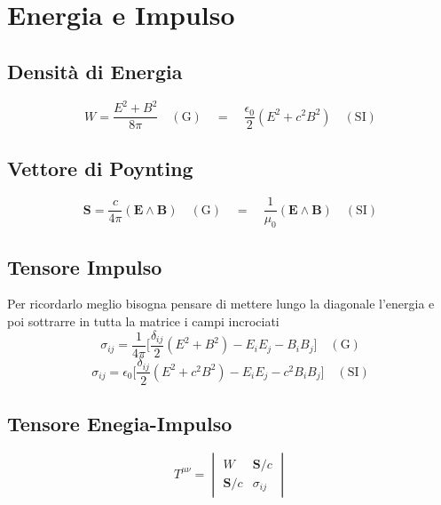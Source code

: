 \documentclass[11pt,a4paper]{report}
\newcommand{\vettore}[1]{\mathbf{#1}}
\newcommand{\pvet}[2]{#1\wedge #2}
\begin{document}
	\section{Energia e Impulso}
		\subsection{Densità di Energia}
			\begin{equation}
				W=\frac{E^2+B^2}{8\pi}\quad(\textrm{G})\quad=\quad\frac{\epsilon_0}{2}(E^2+c^2B^2)\quad(\textrm{SI})
			\end{equation}
		\subsection{Vettore di Poynting}
			\begin{equation}
				\vettore S=\frac c{4\pi}(\pvet{\vettore E}{\vettore B})\quad(\textrm{G})\quad=\quad\frac{1}{\mu_0}(\pvet{\vettore E}{\vettore B})\quad(\textrm{SI})
			\end{equation}
		\subsection{Tensore Impulso}
			Per ricordarlo meglio bisogna pensare di mettere lungo la diagonale l'energia e poi sottrarre in tutta la matrice i campi incrociati
			\begin{equation}
				\sigma_{ij}=\frac 1{4\pi}\bigg[\frac{\delta_{ij}}2(E^2+B^2)-E_iE_j-B_iB_j\bigg]\quad(\textrm {G})
			\end{equation}
			\[
				\sigma_{ij}=\epsilon_0\bigg[\frac{\delta_{ij}}2(E^2+c^2B^2)-E_iE_j-c^2B_iB_j\bigg]\quad(\textrm {SI})
			\]
		\subsection{Tensore Enegia-Impulso}
			\begin{equation}
				T^{\mu\nu}=
				\begin{vmatrix}
					W & \vettore S/c\\
					\vettore S/c & \sigma_{ij}
				\end{vmatrix}
			\end{equation}		
\end{document}
